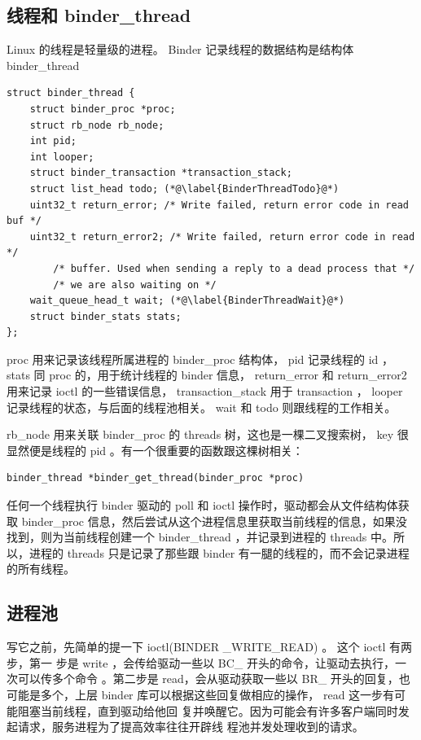 \documentclass[a4paper,11pt]{article}
\begin{document}
\subsection{线程和 binder_thread}
Linux 的线程是轻量级的进程。 Binder 记录线程的数据结构是结构体 binder_thread
\begin{lstlisting}
struct binder_thread {
	struct binder_proc *proc;
	struct rb_node rb_node;
	int pid;
	int looper;
	struct binder_transaction *transaction_stack;
	struct list_head todo; (*@\label{BinderThreadTodo}@*)
	uint32_t return_error; /* Write failed, return error code in read buf */
	uint32_t return_error2; /* Write failed, return error code in read */
		/* buffer. Used when sending a reply to a dead process that */
		/* we are also waiting on */
	wait_queue_head_t wait; (*@\label{BinderThreadWait}@*)
	struct binder_stats stats;
};
\end{lstlisting}

 proc 用来记录该线程所属进程的 binder_proc 结构体， pid 记录线程的 id ， stats
同 proc 的，用于统计线程的 binder 信息， return_error 和 return_error2 用来记录
ioctl 的一些错误信息， transaction_stack 用于 transaction ， looper
记录线程的状态，与后面的线程池相关。 wait 和 todo 则跟线程的工作相关。 

 rb_node 用来关联 binder_proc 的 threads 树，这也是一棵二叉搜索树， key
很显然便是线程的 pid 。有一个很重要的函数跟这棵树相关：
\begin{lstlisting}
binder_thread *binder_get_thread(binder_proc *proc)
\end{lstlisting}

任何一个线程执行 binder 驱动的 poll 和 ioctl 操作时，驱动都会从文件结构体获取
binder_proc 信息，然后尝试从这个进程信息里获取当前线程的信息，如果没找到，则为当前线程创建一个
binder_thread ，并记录到进程的 threads 中。所以，进程的 threads
只是记录了那些跟 binder 有一腿的线程的，而不会记录进程的所有线程。

\subsection{进程池}\label{BinderThreadPool}
写它之前，先简单的提一下 ioctl(BINDER _WRITE_READ) 。 这个 ioctl 有两步，第一
步是 write ，会传给驱动一些以 BC_ 开头的命令，让驱动去执行，一次可以传多个命令
。第二步是 read，会从驱动获取一些以 BR_ 开头的回复，也可能是多个，上层 binder
库可以根据这些回复做相应的操作， read 这一步有可能阻塞当前线程，直到驱动给他回
复并唤醒它。因为可能会有许多客户端同时发起请求，服务进程为了提高效率往往开辟线
程池并发处理收到的请求。
\end{document}
